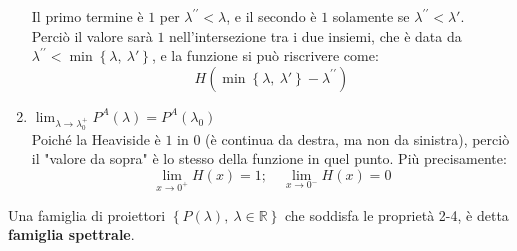 \begin{enumerate}
\[	\]
	Il primo termine è $1$ per $\lambda^{\prime\prime}<\lambda$, e il secondo è $1$ solamente se $\lambda^{\prime\prime}<\lambda'$.\\
	Perciò il valore sarà $1$ nell'intersezione tra i due insiemi, che è data da $\lambda^{\prime\prime}<\min{\left\{\lambda,\ \lambda'\right\}}$, e la funzione si può riscrivere come:
	\[
	H\left(\min{\left\{\lambda,\ \lambda '\right\}}-\lambda^{\prime\prime}\right)
	\]
	\item $\displaystyle \lim_{\lambda\rightarrow\lambda_0^+}{P^A\left(\lambda\right)}=P^A(\lambda_0) $\\
	Poiché la Heaviside è $1$ in $0$ (è continua da destra, ma non da sinistra), perciò il "valore da sopra" è lo stesso della funzione in quel punto. Più precisamente:
	\[
	\lim_{x\rightarrow 0^+}{H \left(x\right)}=1; \quad 
	\lim_{x\rightarrow 0^-}{H\left(x\right)}=0
	\]
\end{enumerate}
\begin{dfn}
Una famiglia di proiettori $\left\{P\left(\lambda\right),\ \lambda\in\mathbb{R}\right\}$ che soddisfa le proprietà 2-4, è detta \textbf{famiglia spettrale}.
\end{dfn}


